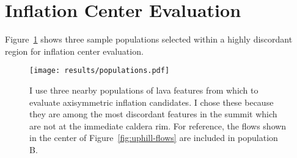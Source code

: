 \newpage
\section{Inflation Center Evaluation}

Figure~\ref{fig:populations} shows three sample populations selected within a highly discordant region for inflation center evaluation. %



\begin{figure}
    \texttt{[image: results/populations.pdf]}%
    \caption[Sample populations for inflation center evaluation]{I use three nearby populations of lava features from which to evaluate axisymmetric inflation candidates. I chose these because they are among the most discordant features in the summit which are not at the immediate caldera rim. For reference, the flows shown in the center of Figure~\ref{fig:uphill-flows} are included in population B.}%
    \label{fig:populations}
\end{figure}

